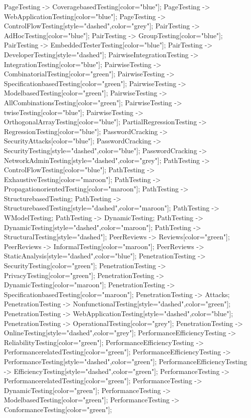 \documentclass{article}
\begin{document}
{PageTesting -> CoveragebasedTesting[color="blue"];
PageTesting -> WebApplicationTesting[color="blue"];
PageTesting -> ControlFlowTesting[style="dashed",color="grey"];
PairTesting -> AdHocTesting[color="blue"];
PairTesting -> GroupTesting[color="blue"];
PairTesting -> EmbeddedTesterTesting[color="blue"];
PairTesting -> DeveloperTesting[style="dashed"];
PairwiseIntegrationTesting -> IntegrationTesting[color="blue"];
PairwiseTesting -> CombinatorialTesting[color="green"];
PairwiseTesting -> SpecificationbasedTesting[color="green"];
PairwiseTesting -> ModelbasedTesting[color="green"];
PairwiseTesting -> AllCombinationsTesting[color="green"];
PairwiseTesting -> twiseTesting[color="blue"];
PairwiseTesting -> OrthogonalArrayTesting[color="blue"];
PartialRegressionTesting -> RegressionTesting[color="blue"];
PasswordCracking -> SecurityAttacks[color="blue"];
PasswordCracking -> SecurityTesting[style="dashed",color="blue"];
PasswordCracking -> NetworkAdminTesting[style="dashed",color="grey"];
PathTesting -> ControlFlowTesting[color="blue"];
PathTesting -> ExhaustiveTesting[color="maroon"];
PathTesting -> PropagationorientedTesting[color="maroon"];
PathTesting -> StructurebasedTesting;
PathTesting -> StructurebasedTesting[style="dashed",color="maroon"];
PathTesting -> WModelTesting;
PathTesting -> DynamicTesting;
PathTesting -> DynamicTesting[style="dashed",color="maroon"];
PathTesting -> StructuralTesting[style="dashed"];
PeerReviews -> Reviews[color="green"];
PeerReviews -> InformalTesting[color="maroon"];
PeerReviews -> StaticAnalysis[style="dashed",color="blue"];
PenetrationTesting -> SecurityTesting[color="green"];
PenetrationTesting -> PrivacyTesting[color="green"];
PenetrationTesting -> DynamicTesting[color="maroon"];
PenetrationTesting -> SpecificationbasedTesting[color="maroon"];
PenetrationTesting -> Attacks;
PenetrationTesting -> NonfunctionalTesting[style="dashed",color="green"];
PenetrationTesting -> WebApplicationTesting[style="dashed",color="blue"];
PenetrationTesting -> OperationalTesting[color="grey"];
PenetrationTesting -> OnlineTesting[style="dashed",color="grey"];
PerformanceEfficiencyTesting -> ReliabilityTesting[color="green"];
PerformanceEfficiencyTesting -> PerformancerelatedTesting[color="green"];
PerformanceEfficiencyTesting -> PerformanceTesting[style="dashed",color="green"];
PerformanceEfficiencyTesting -> EfficiencyTesting[style="dashed",color="green"];
PerformanceTesting -> PerformancerelatedTesting[color="green"];
PerformanceTesting -> DynamicTesting[color="green"];
PerformanceTesting -> ModelbasedTesting[color="green"];
PerformanceTesting -> ConformanceTesting[color="green"];
}
\end{document}

